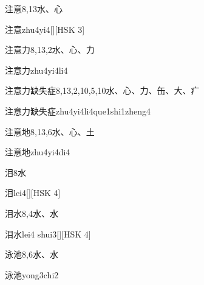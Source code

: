 \begin{entry}{注意}{8,13}{⽔、⼼}
  \begin{phonetics}{注意}{zhu4yi4}[][HSK 3]
  \end{phonetics}
\end{entry}

\begin{entry}{注意力}{8,13,2}{⽔、⼼、⼒}
  \begin{phonetics}{注意力}{zhu4yi4li4}
  \end{phonetics}
\end{entry}

\begin{entry}{注意力缺失症}{8,13,2,10,5,10}{⽔、⼼、⼒、⽸、⼤、⽧}
  \begin{phonetics}{注意力缺失症}{zhu4yi4li4que1shi1zheng4}
  \end{phonetics}
\end{entry}

\begin{entry}{注意地}{8,13,6}{⽔、⼼、⼟}
  \begin{phonetics}{注意地}{zhu4yi4di4}
  \end{phonetics}
\end{entry}

\begin{entry}{泪}{8}{⽔}
  \begin{phonetics}{泪}{lei4}[][HSK 4]
  \end{phonetics}
\end{entry}

\begin{entry}{泪水}{8,4}{⽔、⽔}
  \begin{phonetics}{泪水}{lei4 shui3}[][HSK 4]
  \end{phonetics}
\end{entry}

\begin{entry}{泳池}{8,6}{⽔、⽔}
  \begin{phonetics}{泳池}{yong3chi2}
  \end{phonetics}
\end{entry}

